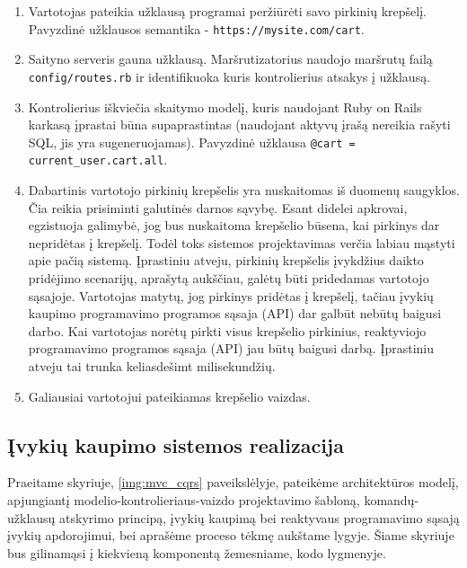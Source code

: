 \begin{enumerate}
  \item Vartotojas pateikia užklausą programai peržiūrėti savo pirkinių krepšelį. Pavyzdinė užklausos semantika - \lstinline|https://mysite.com/cart|.

  \item Saityno serveris gauna užklausą. Maršrutizatorius naudojo maršrutų failą \lstinline|config/routes.rb| ir identifikuoka kuris kontrolierius atsakys į užklausą.

  \item Kontrolierius iškviečia skaitymo modelį, kuris naudojant Ruby on Rails karkasą įprastai būna supaprastintas (naudojant aktyvų įrašą nereikia rašyti SQL, jis yra sugeneruojamas). Pavyzdinė užklausa \lstinline|@cart = current_user.cart.all|.

  \item Dabartinis vartotojo pirkinių krepšelis yra nuskaitomas iš duomenų saugyklos. Čia reikia prisiminti galutinės darnos sąvybę. Esant didelei apkrovai, egzistuoja galimybė, jog bus nuskaitoma krepšelio būsena, kai pirkinys dar nepridėtas į krepšelį. Todėl toks sistemos projektavimas verčia labiau mąstyti apie pačią sistemą. Įprastiniu atveju, pirkinių krepšelis įvykdžius daikto pridėjimo scenarijų, aprašytą aukščiau, galėtų būti pridedamas vartotojo sąsajoje. Vartotojas matytų, jog pirkinys pridėtas į krepšelį, tačiau įvykių kaupimo programavimo programos sąsaja (API) dar galbūt nebūtų baigusi darbo. Kai vartotojas norėtų pirkti visus krepšelio pirkinius, reaktyviojo programavimo programos sąsaja (API) jau būtų baigusi darbą. Įprastiniu atveju tai trunka keliasdešimt milisekundžių.

  \item Galiausiai vartotojui pateikiamas krepšelio vaizdas.
\end{enumerate}

\subsection{Įvykių kaupimo sistemos realizacija}

Praeitame skyriuje, \ref{img:mvc_cqrs} paveikslėlyje, pateikėme architektūros modelį, apjungiantį modelio-kontrolieriaus-vaizdo projektavimo šabloną, komandų-užklausų atskyrimo principą, įvykių kaupimą bei reaktyvaus programavimo sąsają įvykių apdorojimui, bei aprašėme proceso tėkmę aukštame lygyje. Šiame skyriuje bus gilinamąsi į kiekvieną komponentą žemesniame, kodo lygmenyje.

